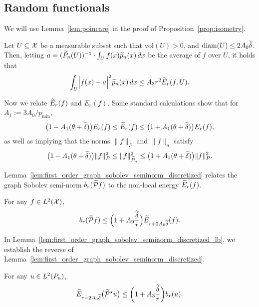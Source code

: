 \subsection{Random functionals}
\label{subsec:random_functionals}

We will use Lemma~\ref{lem:poincare} in the proof of Proposition~\ref{prop:isometry}. 
\begin{lemma}
	\label{lem:poincare}
	Let $U \subseteq \mathcal{X}$ be a measurable subset such that $\mathrm{vol}(U) > 0$, and $\mathrm{diam}(U) \leq 2A_0\widetilde{\delta}$. Then, letting $a = (\widetilde{P}_n(U))^{-1} \cdot \int_{U} f(x) \widetilde{p}_n(x) \,dx$ be the average of $f$ over $U$, it holds that
	\begin{equation*}
	\int_{U} \Bigl|f(x)-a\Bigr|^2 \widetilde{p}_n(x)\,dx \leq A_3 r^2 \widetilde{E}_r(f,U).
	\end{equation*}
\end{lemma}

Now we relate $\widetilde{E}_r(f)$ and $E_r(f)$. Some standard calculations show that for $A_1 := 3A_0/p_{\min}$,
\begin{equation}
\label{eqn:calder19_1}
\bigl(1 - A_1(\theta + \widetilde{\delta})\bigr) E_r(f) \leq \widetilde{E}_r(f) \leq \bigl(1 + A_1(\theta + \widetilde{\delta})\bigr) E_r(f),
\end{equation}
as well as implying that the norms $\|f\|_{P}$ and $\|f\|_{n}$ satisfy
\begin{equation}
\label{eqn:calder19_2}
\bigl(1 - A_1(\theta + \widetilde{\delta})\bigr) \|f\|_{P}^2 \leq \|f\|_{\widetilde{P}_n}^2 \leq \bigl(1 + A_1(\theta + \widetilde{\delta})\bigr) \|f\|_{P}^2.
\end{equation}

Lemma~\ref{lem:first_order_graph_sobolev_seminorm_discretized} relates the graph Sobolev semi-norm $b_r(\widetilde{\mathcal{P}}f)$ to the non-local energy $\widetilde{E}_r(f)$. 
\begin{lemma}
	\label{lem:first_order_graph_sobolev_seminorm_discretized}
	For any $f \in L^2(\mathcal{X})$,
	\begin{equation*}
	b_r(\widetilde{\mathcal{P}}f) \leq \Bigl(1 + A_9\frac{\widetilde{\delta}}{r}\Bigr) \widetilde{E}_{r + 2A_0\widetilde{\delta}}(f).
	\end{equation*}
\end{lemma}

In Lemma~\ref{lem:first_order_graph_sobolev_seminorm_discretized_lb}, we establish the reverse of Lemma~\ref{lem:first_order_graph_sobolev_seminorm_discretized}. 
\begin{lemma}
	\label{lem:first_order_graph_sobolev_seminorm_discretized_lb}
	For any $u \in L^2(P_n)$, 
	\begin{equation*}
	\widetilde{E}_{r - 2A_0\widetilde{\delta}}\bigl(\widetilde{\mathcal{P}}^{\star}u\bigr) \leq \biggl(1 + A_3\frac{\widetilde{\delta}}{r}\biggr) b_{r}(u).
	\end{equation*}
\end{lemma}

